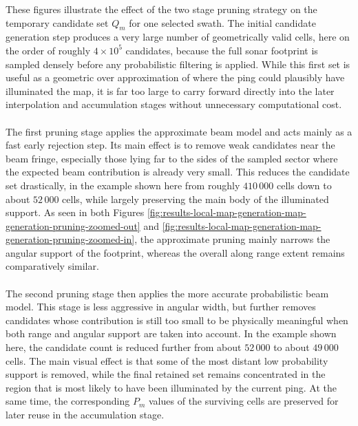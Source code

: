 \newpage

\noindent
These figures illustrate the effect of the two stage pruning strategy on the temporary candidate set $Q_m$ for one selected swath. The initial candidate generation step produces a very large number of geometrically valid cells, here on the order of roughly $4\times 10^5$ candidates, because the full sonar footprint is sampled densely before any probabilistic filtering is applied. While this first set is useful as a geometric over approximation of where the ping could plausibly have illuminated the map, it is far too large to carry forward directly into the later interpolation and accumulation stages without unnecessary computational cost.
\\ \\
The first pruning stage applies the approximate beam model and acts mainly as a fast early rejection step. Its main effect is to remove weak candidates near the beam fringe, especially those lying far to the sides of the sampled sector where the expected beam contribution is already very small. This reduces the candidate set drastically, in the example shown here from roughly $410\,000$ cells down to about $52\,000$ cells, while largely preserving the main body of the illuminated support. As seen in both Figures \ref{fig:results-local-map-generation-map-generation-pruning-zoomed-out} and \ref{fig:results-local-map-generation-map-generation-pruning-zoomed-in}, the approximate pruning mainly narrows the angular support of the footprint, whereas the overall along range extent remains comparatively similar.
\\ \\
The second pruning stage then applies the more accurate probabilistic beam model. This stage is less aggressive in angular width, but further removes candidates whose contribution is still too small to be physically meaningful when both range and angular support are taken into account. In the example shown here, the candidate count is reduced further from about $52\,000$ to about $49\,000$ cells. The main visual effect is that some of the most distant low probability support is removed, while the final retained set remains concentrated in the region that is most likely to have been illuminated by the current ping. At the same time, the corresponding $P_m$ values of the surviving cells are preserved for later reuse in the accumulation stage.
\\ \\
